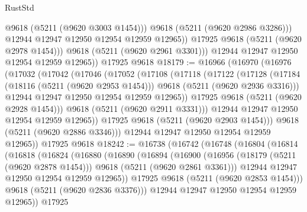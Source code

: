 \begin{lexlean}{RustStd}
\begin{coremodule}
                    @9618
                    (@5211 (@9620 @3003 @1454)))
                  @9618
                  (@5211 (@9620 @2986 @3286)))
                @12944
                @12947
                @12950
                @12954
                @12959
                @12965))
            @17925
            @9618
            (@5211 (@9620 @2978 @1454)))
          @9618
          (@5211 (@9620 @2961 @3301)))
        @12944
        @12947
        @12950
        @12954
        @12959
        @12965))
    @17925
    @9618
@18179 := @16966
    (@16970
      (@16976
        (@17032
          (@17042
            (@17046
              (@17052
                (@17108
                  (@17118
                    (@17122
                      (@17128
                        (@17184
                          (@18116 (@5211 (@9620 @2953 @1454)))
                          @9618
                          (@5211 (@9620 @2936 @3316)))
                        @12944
                        @12947
                        @12950
                        @12954
                        @12959
                        @12965))
                    @17925
                    @9618
                    (@5211 (@9620 @2928 @1454)))
                  @9618
                  (@5211 (@9620 @2911 @3331)))
                @12944
                @12947
                @12950
                @12954
                @12959
                @12965))
            @17925
            @9618
            (@5211 (@9620 @2903 @1454)))
          @9618
          (@5211 (@9620 @2886 @3346)))
        @12944
        @12947
        @12950
        @12954
        @12959
        @12965))
    @17925
    @9618
@18242 := @16738
    (@16742
      (@16748
        (@16804
          (@16814
            (@16818
              (@16824
                (@16880
                  (@16890
                    (@16894
                      (@16900
                        (@16956
                          (@18179 (@5211 (@9620 @2878 @1454)))
                          @9618
                          (@5211 (@9620 @2861 @3361)))
                        @12944
                        @12947
                        @12950
                        @12954
                        @12959
                        @12965))
                    @17925
                    @9618
                    (@5211 (@9620 @2853 @1454)))
                  @9618
                  (@5211 (@9620 @2836 @3376)))
                @12944
                @12947
                @12950
                @12954
                @12959
                @12965))
            @17925

\end{coremodule}
\end{lexlean}
